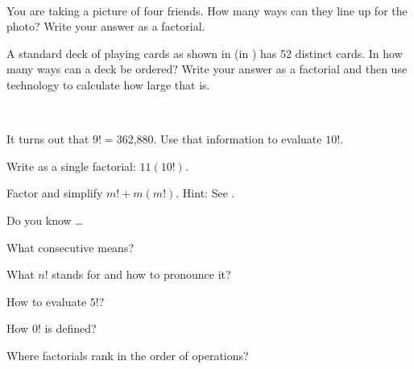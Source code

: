 \begin{exer} [\exerP] %
\label{exer_application_factorial}
~
    \begin{exerpart}
        \item You are taking a picture of four friends.  How many ways can they line up for the photo? Write your answer as a factorial.  
        \item A standard deck of playing cards as shown in  (in ) has 52 distinct cards.  In how many ways can a deck be ordered?  Write your answer as a factorial and then use technology to calculate how large that is.  
    \end{exerpart}
\end{exer}

\begin{exer} [\exerU] %
\label{exer_single_factorial}
~
    \begin{exerpart}
        \item It turns out that $9!=$362,880.  Use that information to evaluate $10!$.
        \item Write as a single factorial:  $11(10!)$.
    \end{exerpart}
\end{exer}

\begin{exer}[\exerU] %
\label{exer_factor_factorials}
    Factor and simplify $m!+m(m!).$ Hint: See .
\end{exer}

\begin{exer}[\exerR] %
\label{exer_dyk_factorials}
    Do you know \ldots
        \begin{exerpart}
            \item What consecutive means?
            \item What $n!$ stands for and how to pronounce it?
            \item How to evaluate $5!$?
            \item How $0!$ is defined?
            \item Where factorials rank in the order of operations?
        \end{exerpart}
\end{exer}

\subsection{\answers}


